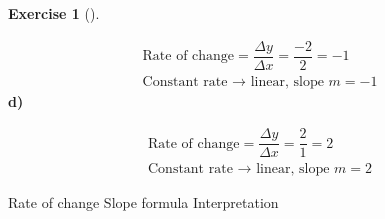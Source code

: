 \documentclass[
  letterpaper,
  DIV=11,
  numbers=noendperiod]{scrreprt}
\theoremstyle{definition}
\newtheorem{exercise}{Exercise}[chapter]
\theoremstyle{remark}
\begin{document}
\begin{exercise}[]
\begin{tcolorbox}
\[
\begin{aligned}
\text{Rate of change} = \dfrac{\Delta y}{\Delta x} = \dfrac{-2}{2} = -1 \\[4pt] \text{Constant rate → linear, slope } m = -1
\end{aligned}
\] \textbf{d)}

\[
\begin{aligned}
\text{Rate of change} = \dfrac{\Delta y}{\Delta x} = \dfrac{2}{1} = 2 \\[4pt] \text{Constant rate → linear, slope } m = 2
\end{aligned}
\]

\end{tcolorbox}

{Rate of change} {Slope formula} {Interpretation}

\end{exercise}
\end{document}
